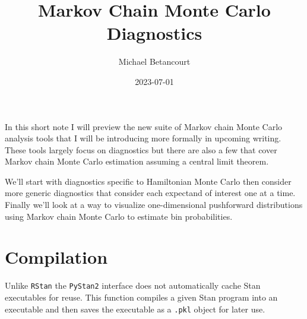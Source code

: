 \documentclass[
  letterpaper,
  DIV=11,
  numbers=noendperiod]{scrartcl}
\title{Markov Chain Monte Carlo Diagnostics}
\author{Michael Betancourt}
\date{2023-07-01}
\renewcommand*\contentsname{Table of contents}
\newcommand\contentsname{Table of contents}
\begin{document}
\maketitle
\ifdefined\Shaded\renewenvironment{Shaded}{\begin{tcolorbox}[frame hidden, enhanced, boxrule=0pt, interior hidden, borderline west={3pt}{0pt}{shadecolor}, sharp corners, breakable]}{\end{tcolorbox}}\fi

\renewcommand*\contentsname{Table of contents}
{
\hypersetup{linkcolor=}
\setcounter{tocdepth}{3}
\tableofcontents
}
In this short note I will preview the new suite of Markov chain Monte
Carlo analysis tools that I will be introducing more formally in
upcoming writing. These tools largely focus on diagnostics but there are
also a few that cover Markov chain Monte Carlo estimation assuming a
central limit theorem.

We'll start with diagnostics specific to Hamiltonian Monte Carlo then
consider more generic diagnostics that consider each expectand of
interest one at a time. Finally we'll look at a way to visualize
one-dimensional pushforward distributions using Markov chain Monte Carlo
to estimate bin probabilities.

\hypertarget{compilation}{%
\section{Compilation}\label{compilation}}

Unlike \texttt{RStan} the \texttt{PyStan2} interface does not
automatically cache Stan executables for reuse. This function compiles a
given Stan program into an executable and then saves the executable as a
\texttt{.pkl} object for later use.
\end{document}
